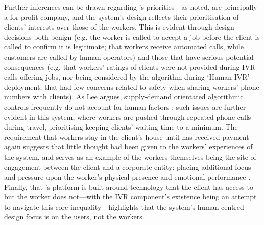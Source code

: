 Further inferences can be drawn regarding \PC's priorities---as noted, \PC{} are principally a for-profit company, and the system's design reflects their prioritisation of clients' interests over those of the workers. This is evident through design decisions both benign (e.g. the worker is called to accept a job before the client is called to confirm it is legitimate; that workers receive automated calls, while customers are called by human operators) and those that have serious potential consequences (e.g. that workers' ratings of clients were not provided during IVR calls offering jobs, nor being considered by the algorithm during `Human IVR' deployment; that \PC{} had few concerns related to safety when sharing workers' phone numbers with clients). As Lee argues, supply-demand orientated algorithmic controls frequently do not account for human factors \citep{lee2015}: such issues are further evident in this system, where workers are pushed through repeated phone calls during travel, prioritising keeping clients' waiting time to a minimum. The requirement that workers stay in the client's house until \PC{} has received payment again suggests that little thought had been given to the workers' experiences of the system, and serves as an example of the workers themselves being the site of engagement between the client and a corporate entity: placing additional focus and pressure upon the worker's physical presence and emotional performance \cite{raval2016}. Finally, that \PC{}'s platform is built around technology that the client has access to but the worker does not---with the IVR component's existence being an attempt to navigate this core inequality---highlights that the system's human-centred design focus is on the users, not the workers.

